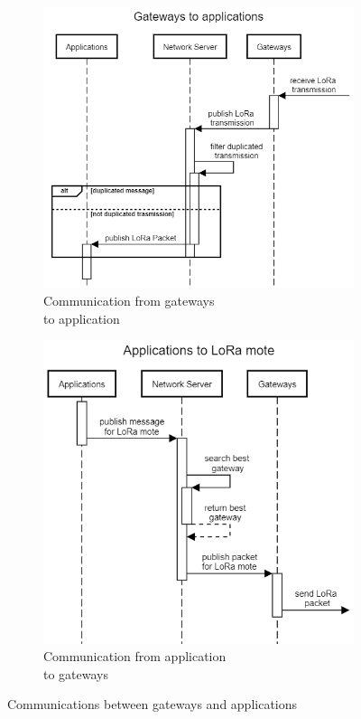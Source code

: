 \begin{figure}[h]
    \centering
    \begin{subfigure}{.495\textwidth}
        \includegraphics[scale=0.37]{figures/GtoApp.png}
        \caption{Communication from gateways \\to application}
        \label{fig:GtoA}
    \end{subfigure}
    \begin{subfigure}{.495\textwidth}
        \includegraphics[scale=0.37]{figures/AppToG.png}
        \caption{Communication from application \\to gateways}
        \label{fig:AtoG}
    \end{subfigure}
    \caption{Communications between gateways and applications}
    \label{fig:netSer}
\end{figure}

